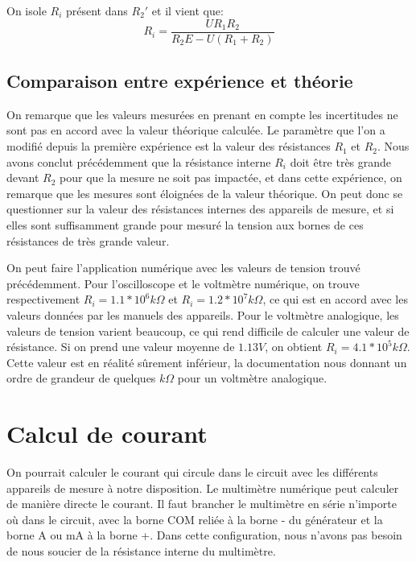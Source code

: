 \documentclass[10pt]{article}
\begin{document}
On isole $R_i$ présent dans $R_2'$ et il vient que:
\begin{equation}
    R_i = \frac{U R_1 R_2}{R_2 E - U (R_1 + R_2)}
\end{equation}

\subsection{Comparaison entre expérience et théorie}


	On remarque que les valeurs mesurées en prenant en compte les incertitudes ne sont pas en accord avec la valeur théorique calculée.
Le paramètre que l'on a modifié depuis la première expérience est la valeur des résistances $R_1$ et $R_2$. 
Nous avons conclut précédemment que la résistance interne $R_i$ doit être très grande devant $R_2$ pour que la mesure ne soit pas impactée,
et dans cette expérience, on remarque que les mesures sont éloignées de la valeur théorique. 
On peut donc se questionner sur la valeur des résistances internes des appareils de mesure, et si elles sont suffisamment grande
pour mesuré la tension aux bornes de ces résistances de très grande valeur.


On peut faire l'application numérique avec les valeurs de tension trouvé précédemment. Pour l'oscilloscope et le voltmètre numérique, on trouve respectivement $R_i = 1.1*10^{6} k\Omega$ et $R_i = 1.2*10^{7} k\Omega$, ce qui est en accord avec les valeurs données par les manuels des appareils. Pour le voltmètre analogique, les valeurs de tension varient beaucoup, ce qui rend difficile de calculer une valeur de résistance. Si on prend une valeur moyenne de $1.13V$, on obtient $R_i= 4.1*10^{5} k\Omega$. Cette valeur est en réalité sûrement inférieur, la documentation nous donnant un ordre de grandeur de quelques $k\Omega$ pour un voltmètre analogique. 
\section{Calcul de courant}


	On pourrait calculer le courant qui circule dans le circuit avec les différents appareils de mesure à notre disposition. Le multimètre numérique peut calculer de manière directe le courant. Il faut brancher le multimètre en série n'importe où dans le circuit, avec la borne COM reliée  à la borne - du générateur et la borne A ou mA à la borne +. Dans cette configuration, nous n'avons pas besoin de nous soucier de la résistance interne du multimètre.
\end{document}
